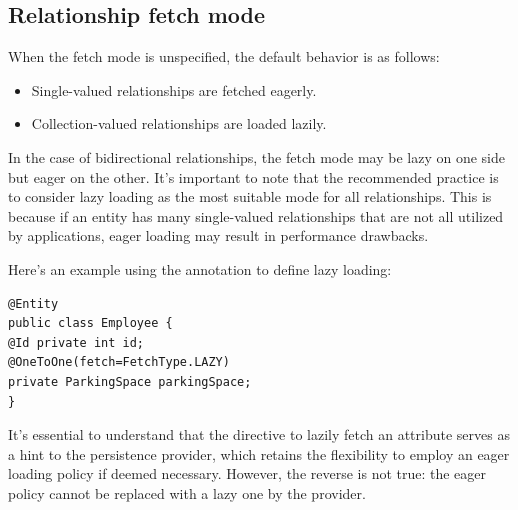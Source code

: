\subsection{Relationship fetch mode}
When the fetch mode is unspecified, the default behavior is as follows:
\begin{itemize}
    \item Single-valued relationships are fetched eagerly.
    \item Collection-valued relationships are loaded lazily.
\end{itemize}
In the case of bidirectional relationships, the fetch mode may be lazy on one side but eager on the other. 
It's important to note that the recommended practice is to consider lazy loading as the most suitable mode for all relationships.
This is because if an entity has many single-valued relationships that are not all utilized by applications, eager loading may result in performance drawbacks.
\begin{example}
    Here's an example using the annotation to define lazy loading:
    \begin{lstlisting}[style=Java]
@Entity
public class Employee {
@Id private int id;
@OneToOne(fetch=FetchType.LAZY)
private ParkingSpace parkingSpace;
}
    \end{lstlisting}
\end{example}
It's essential to understand that the directive to lazily fetch an attribute serves as a hint to the persistence provider, which retains the flexibility to employ an eager loading policy if deemed necessary. 
However, the reverse is not true: the eager policy cannot be replaced with a lazy one by the provider.

